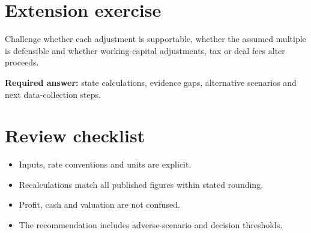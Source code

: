 \documentclass[11pt]{article}
\begin{document}
\section{Extension exercise}
Challenge whether each adjustment is supportable, whether the assumed multiple is defensible and whether working-capital adjustments, tax or deal fees alter proceeds.\par\textbf{Required answer:} state calculations, evidence gaps, alternative scenarios and next data-collection steps.
\section{Review checklist}
\begin{itemize}[leftmargin=*,itemsep=3pt]
\item Inputs, rate conventions and units are explicit.
\item Recalculations match all published figures within stated rounding.
\item Profit, cash and valuation are not confused.
\item The recommendation includes adverse-scenario and decision thresholds.
\end{itemize}
\end{document}
